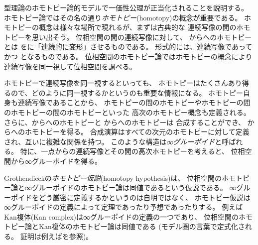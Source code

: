 \documentclass[index]{subfiles}
\begin{document}

型理論のホモトピー論的モデルで一価性公理が正当化されることを説明する。
ホモトピー論ではその名の通り\emph{ホモトピー}(homotopy)の概念が重要である。
ホモトピーの概念は様々な場所で現れるが、まずは古典的な
連続写像の間のホモトピーを思い出そう。
位相空間の間の連続写像に対して、
からへのホモトピーとは
をに「連続的に変形」させるものである。
形式的には、連続写像であって
かつ
となるものである。
位相空間のホモトピー論ではホモトピーの概念により連続写像を同一視して位相空間を調べる。

ホモトピーで連続写像を同一視するといっても、
ホモトピーはたくさんあり得るので、どのように同一視するかというのも重要な情報になる。
ホモトピー自身も連続写像であることから、
ホモトピーの間のホモトピーやホモトピーの間のホモトピーの間のホモトピーといった
高次のホモトピー概念も定義される。
さらに、からへのホモトピーと
からへのホモトピーは
合成することができ、
からへのホモトピーを得る。
合成演算はすべての次元のホモトピーに対して定義され、互いに複雑な関係を持つ。
このような構造は\emph{∞グルーポイド}と呼ばれる。
特に、一点からの連続写像とその間の高次ホモトピーを考えると、
位相空間から∞グルーポイドを得る。

Grothendieckの\emph{ホモトピー仮説}(homotopy hypothesis)は、
位相空間のホモトピー論と∞グルーポイドのホモトピー論は同値であるという仮説である。
∞グルーポイドをどう厳密に定義するかというのは自明ではなく、
ホモトピー仮説は∞グルーポイドの定義によって定理であったり予想であったりする。
例えばKan複体(Kan complex)は∞グルーポイドの定義の一つであり、
位相空間のホモトピー論とKan複体のホモトピー論は同値である
(モデル圏の言葉で定式化される。
証明は例えばを参照)。
\end{document}
